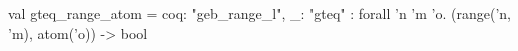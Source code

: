val gteq_range_atom = {coq: "geb_range_l", _: "gteq"} : forall 'n 'm 'o. (range('n, 'm), atom('o)) -> bool
